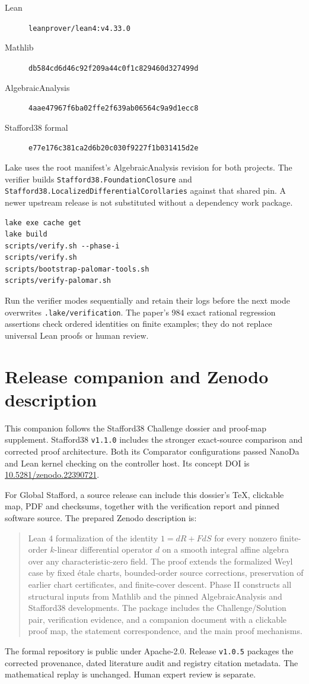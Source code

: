 \documentclass[11pt,a4paper]{article}
\newcommand{\code}[1]{\nolinkurl{#1}}
\begin{document}
\begin{description}
\item[Lean] \code{leanprover/lean4:v4.33.0}
\item[Mathlib] \nolinkurl{db584cd6d46c92f209a44c0f1c829460d327499d}
\item[AlgebraicAnalysis] \nolinkurl{4aae47967f6ba02ffe2f639ab06564c9a9d1ecc8}
\item[Stafford38 formal] \nolinkurl{e77e176c381ca2d6b20c030f9227f1b031415d2e}
\end{description}
Lake uses the root manifest's AlgebraicAnalysis revision for both projects.
The verifier builds \code{Stafford38.FoundationClosure} and
\code{Stafford38.LocalizedDifferentialCorollaries} against that shared pin.
A newer upstream release is not substituted without a dependency work package.

\begin{Verbatim}[fontsize=\small,frame=single]
lake exe cache get
lake build
scripts/verify.sh --phase-i
scripts/verify.sh
scripts/bootstrap-palomar-tools.sh
scripts/verify-palomar.sh
\end{Verbatim}
Run the verifier modes sequentially and retain their logs before the next
mode overwrites \code{.lake/verification}. The paper's 984 exact rational
regression assertions check ordered identities on finite examples; they do
not replace universal Lean proofs or human review.

\section{Release companion and Zenodo description}\label{sec:release}
This companion follows the Stafford38 Challenge dossier and proof-map
supplement. Stafford38 \code{v1.1.0} includes the stronger exact-source comparison and corrected proof architecture. Both its Comparator configurations passed NanoDa and Lean kernel checking on the controller host. Its concept DOI is
\href{https://doi.org/10.5281/zenodo.22390721}{10.5281/zenodo.22390721}.

For Global Stafford, a source release can include this dossier's TeX,
clickable map, PDF and checksums, together with the verification report and
pinned software source. The prepared Zenodo description is:
\begin{quote}
Lean 4 formalization of the identity $1=dR+FdS$ for every nonzero finite-order
$k$-linear differential operator $d$ on a smooth integral affine algebra over
any characteristic-zero field. The proof extends the formalized Weyl case by
fixed \'etale charts, bounded-order source corrections, preservation of earlier
chart certificates, and finite-cover descent. Phase II constructs all
structural inputs from Mathlib and the pinned AlgebraicAnalysis and
Stafford38 developments. The package includes the Challenge/Solution pair,
verification evidence, and a companion document with a clickable proof map,
the statement correspondence, and the main proof mechanisms.
\end{quote}
The formal repository is public under Apache-2.0. Release \code{v1.0.5} packages the corrected provenance, dated literature audit and registry citation metadata. The mathematical replay is unchanged. Human expert review is separate.
\end{document}

